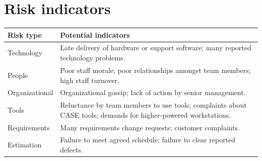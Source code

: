 \section{ Risk indicators}
\begin{table}[h!]
\centering
\begin{tabular}{ |p{4cm}|p{8cm}|  }
\hline
Risk type & Potential indicators\\
\hline
\hline
Technology & Late delivery of hardware or support software; many reported technology problems.\\
\hline
People & Poor staff morale; poor relationships amongst team members; high staff turnover.\\
\hline
Organizational & Organizational gossip; lack of action by senior management.\\
\hline
Tools & Reluctance by team members to use tools; complaints about CASE tools; demands for higher-powered workstations.\\
\hline
Requirements & Many requirements change requests; customer complaints.\\
\hline
Estimation & Failure to meet agreed schedule; failure to clear reported defects.\\
\hline

\end{tabular}

\label{table:T5_4}
\end{table}


